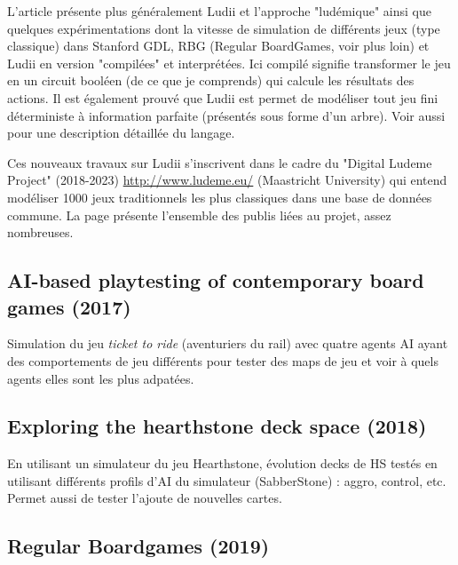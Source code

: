 \documentclass[a4paper,11pt]{article}
\begin{document}
L'article \cite{piette2019ludii} présente plus généralement Ludii  et l'approche "ludémique" ainsi que quelques expérimentations dont la vitesse de simulation de différents jeux (type classique)
dans Stanford GDL, RBG (Regular BoardGames, voir plus loin) et Ludii  en version "compilées" et interprétées. Ici compilé signifie transformer le jeu en un circuit booléen (de ce que je comprends) qui calcule les résultats des actions. Il est également prouvé que Ludii est permet de modéliser tout jeu fini déterministe à information parfaite (présentés sous forme d'un arbre).
Voir aussi \cite{piette2021ludii} pour une description détaillée du langage.

Ces nouveaux travaux sur Ludii s'inscrivent dans le cadre du "Digital Ludeme Project" (2018-2023) \url{http://www.ludeme.eu/} (Maastricht University) qui entend modéliser 1000 jeux traditionnels les plus classiques dans une base de données commune. La page présente l'ensemble des publis liées au projet, assez nombreuses.



\subsection{AI-based playtesting of contemporary board games (2017) \cite{demesentier2017aibased}}


Simulation du jeu {\it ticket to ride} (aventuriers du rail) avec quatre agents AI ayant des comportements de jeu différents pour tester des maps de jeu et voir à quels agents elles sont les plus adpatées.



\subsection{Exploring the hearthstone deck space (2018) \cite{bhatt2018exploring} }

En utilisant un simulateur du jeu Hearthstone, évolution 
decks de HS testés en utilisant différents profils d'AI du simulateur (SabberStone) : aggro, control, etc. Permet aussi de tester l'ajoute de nouvelles cartes.

\subsection{Regular Boardgames (2019) \cite{kowalski2019regular}}
\end{document}
